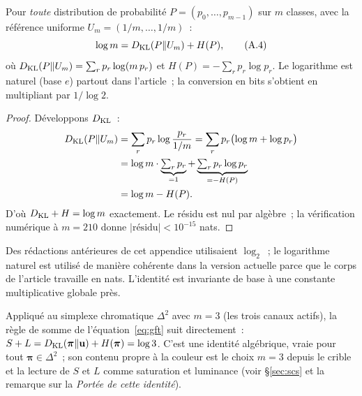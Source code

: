 \documentclass[12pt,a4paper]{article}
\begin{document}
\begin{identitybox}[R\`egle de somme~: $\DKL + H = \log m$]
Pour \emph{toute} distribution de probabilit\'e
$P = (p_0, \ldots, p_{m-1})$ sur $m$ classes, avec la r\'ef\'erence
uniforme $U_m = (1/m, \ldots, 1/m)$~:
\begin{equation}
  \log m = D_{\mathrm{KL}}(P \| U_m) + H(P),
  \tag{A.4}
\end{equation}
o\`u $D_{\mathrm{KL}}(P\|U_m) = \sum_r p_r \log(m\, p_r)$ et
$H(P) = -\sum_r p_r \log p_r$. Le logarithme est naturel (base $e$)
partout dans l'article~; la conversion en bits s'obtient en
multipliant par $1/\log 2$.

\begin{proof}
D\'eveloppons $D_{\mathrm{KL}}$~:
\begin{align*}
  D_{\mathrm{KL}}(P\|U_m)
  &= \sum_r p_r \log\frac{p_r}{1/m}
   = \sum_r p_r \bigl(\log m + \log p_r\bigr) \\
  &= \log m \cdot \underbrace{\textstyle\sum_r p_r}_{=1}
   + \underbrace{\textstyle\sum_r p_r \log p_r}_{=-H(P)} \\
  &= \log m - H(P).
\end{align*}
D'o\`u $\DKL + H = \log m$ exactement. Le r\'esidu est nul par
alg\`ebre~; la v\'erification num\'erique \`a $m = 210$ donne
$|\text{r\'esidu}| < 10^{-15}$ nats.
\end{proof}
\end{identitybox}

\begin{remark}
Des r\'edactions ant\'erieures de cet appendice utilisaient $\log_2$~;
le logarithme naturel est utilis\'e de mani\`ere coh\'erente dans la
version actuelle parce que le corps de l'article travaille en nats.
L'identit\'e est invariante de base \`a une constante multiplicative
globale pr\`es.
\end{remark}

\begin{remark}
Appliqu\'e au simplexe chromatique $\Delta^2$ avec $m = 3$ (les trois
canaux actifs), la r\`egle de somme de l'\'equation~\eqref{eq:gft}
suit directement~:
$S + L = D_{\mathrm{KL}}(\bm{\pi}\|\mathbf{u}) + H(\bm{\pi}) = \log 3$. C'est une
identit\'e alg\'ebrique, vraie pour tout $\bm{\pi} \in \Delta^2$~; son
contenu propre \`a la couleur est le choix $m = 3$ depuis le crible
et la lecture de $S$ et $L$ comme saturation et luminance (voir
\S\ref{sec:scs} et la remarque sur la \emph{Port\'ee de cette
identit\'e}).
\end{remark}

\end{document}
